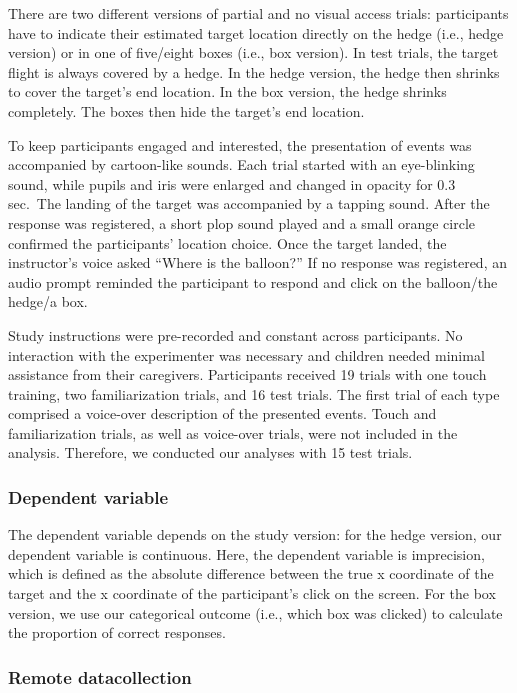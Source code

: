 \documentclass[
  english,
  man,floatsintext]{apa6}
\begin{document}
There are two different versions of partial and no visual access trials: participants have to indicate their estimated target location directly on the hedge (i.e., hedge version) or in one of five/eight boxes (i.e., box version). In test trials, the target flight is always covered by a hedge. In the hedge version, the hedge then shrinks to cover the target's end location. In the box version, the hedge shrinks completely. The boxes then hide the target's end location.

To keep participants engaged and interested, the presentation of events was accompanied by cartoon-like sounds. Each trial started with an eye-blinking sound, while pupils and iris were enlarged and changed in opacity for 0.3 sec.~The landing of the target was accompanied by a tapping sound. After the response was registered, a short plop sound played and a small orange circle confirmed the participants' location choice. Once the target landed, the instructor's voice asked ``Where is the balloon?'' If no response was registered, an audio prompt reminded the participant to respond and click on the balloon/the hedge/a box.

Study instructions were pre-recorded and constant across participants. No interaction with the experimenter was necessary and children needed minimal assistance from their caregivers. Participants received 19 trials with one touch training, two familiarization trials,
and 16 test trials. The first trial of each type comprised a voice-over description of the presented events. Touch and familiarization trials, as well as voice-over trials, were not included in the analysis. Therefore, we conducted our analyses with 15 test trials.

\hypertarget{dependent-variable}{%
\subsubsection{Dependent variable}\label{dependent-variable}}

The dependent variable depends on the study version: for the hedge version, our dependent variable is continuous. Here, the dependent variable is imprecision, which is defined as the absolute difference between the true x coordinate of the target and the x coordinate of the participant's click on the screen. For the box version, we use our categorical outcome (i.e., which box was clicked) to calculate the proportion of correct responses.

\hypertarget{remote-datacollection}{%
\subsubsection{Remote datacollection}\label{remote-datacollection}}
\end{document}
